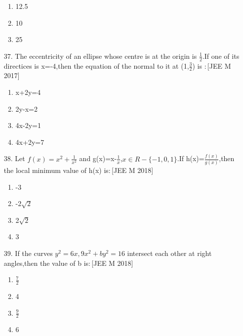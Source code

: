 \documentclass[journal,12pt,twocolumn]{IEEEtran}
\theoremstyle{remark}
\begin{document}
\begin{enumerate}
\begin{enumerate}
    \item  12.5\\
    \item  10\\
    \item  25\\
\end{enumerate}
\item[37.]The eccentricity of an ellipse whose centre is at the origin is $\frac{1}{2}$.If one of its directices is x=-4,then the equation of the normal to it at (1,$\frac{3}{2}$) is $:$\hfill[JEE M 2017]\\
\begin{enumerate}
    \item  x+2y=4\\
    \item  2y-x=2\\
    \item  4x-2y=1\\
    \item  4x+2y=7\\
\end{enumerate}
\item[38.] Let $f(x)=x^{2}+\frac{1}{x^2}$ and g(x)=x-$\frac{1}{x}$,$x \in R-{\{-1,0,1}\}$.If h(x)=$\frac{f(x)}{g(x)}$,then the local minimum value of h(x) is$:$\hfill[JEE M 2018]\\
\begin{enumerate}
    \item  -3\\
    \item  -2$\sqrt{2}$\\
    \item   2$\sqrt{2}$\\
    \item   3\\
\end{enumerate}
\item[39.] If the curves $y^2=6x,9x^2+by^2=16$ intersect each other at right angles,then the value of b is$:$\hfill[JEE M 2018]\\
\begin{enumerate}
    \item  $\frac{7}{2}$\\
    \item  4\\
    \item  $\frac{9}{2}$\\
    \item  6\\
\end{enumerate}

\end{enumerate}\
\end{document}
